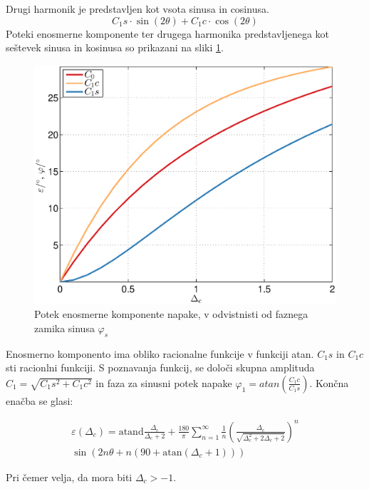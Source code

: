 \documentclass[a4paper]{article}
\begin{document}
Drugi harmonik je predstavljen kot vsota sinusa in cosinusa.
\begin{equation}
C_1s \cdot\sin(2\theta)+C_1c \cdot\cos(2\theta)
\end{equation}
Poteki enosmerne komponente ter drugega harmonika predstavljenega kot seštevek sinusa in kosinusa so prikazani na sliki \ref{fig:dc}.
\begin{figure}[!htb]
	\begin{center}
		\includegraphics[width=\linewidth]{./Slike/dc.eps}
		\caption{Potek enosmerne komponente napake, v odvistnisti od faznega zamika sinusa $\varphi_{s}$} \label{fig:dc}
	\end{center}
\end{figure}

Enosmerno komponento ima obliko racionalne funkcije v funkciji atan.
$C_1s$ in $C_1c$ sti racionlni funkciji. S poznavanja funkcij, se določi skupna amplituda $C_1 = \sqrt{C_1s^2+C_1c^2}$ in faza za sinusni potek napake $\varphi_{1} = atan(\frac{C_1c}{C_1s})$. Končna enačba se glasi:

 \begin{multline}
\label{equ:dc_err}
\varepsilon(\Delta_c) = \mathrm{atand}\frac{\Delta_c}{\Delta_c+2}+\frac{180}{\pi} \sum_{n=1}^{\infty}\frac{1}{n} (\frac{\Delta_c}{\sqrt{\Delta_c^2+2 \Delta_c+2}})^n \\ \sin (2n \theta+n (90+ \mathrm{ atan}(\Delta_c+1)))
\end{multline}

Pri čemer velja, da mora biti $\Delta_c > -1$.
\end{document}
